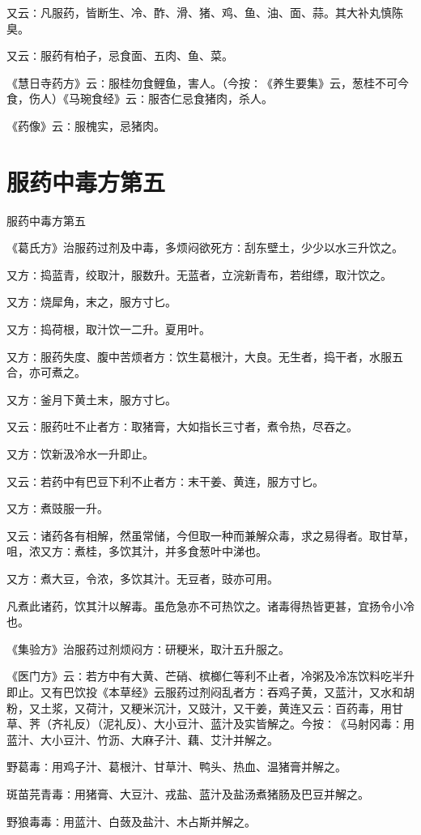 \documentclass[a4paper,12pt,UTF8,twoside]{ctexbook}
\begin{document}
又云∶凡服药，皆断生、冷、酢、滑、猪、鸡、鱼、油、面、蒜。其大补丸慎陈臭。

又云∶服药有柏子，忌食面、五肉、鱼、菜。

《慧日寺药方》云∶服桂勿食鲤鱼，害人。（今按∶《养生要集》云，葱桂不可今食，伤人）《马琬食经》云∶服杏仁忌食猪肉，杀人。

《药像》云∶服槐实，忌猪肉。

\chapter{服药中毒方第五}
服药中毒方第五

《葛氏方》治服药过剂及中毒，多烦闷欲死方∶刮东壁土，少少以水三升饮之。

又方∶捣蓝青，绞取汁，服数升。无蓝者，立浣新青布，若绀缥，取汁饮之。

又方∶烧犀角，末之，服方寸匕。

又方∶捣荷根，取汁饮一二升。夏用叶。

又方∶服药失度、腹中苦烦者方∶饮生葛根汁，大良。无生者，捣干者，水服五合，亦可煮之。

又方∶釜月下黄土末，服方寸匕。

又云∶服药吐不止者方∶取猪膏，大如指长三寸者，煮令热，尽吞之。

又方∶饮新汲冷水一升即止。

又云∶若药中有巴豆下利不止者方∶末干姜、黄连，服方寸匕。

又方∶煮豉服一升。

又云∶诸药各有相解，然虽常储，今但取一种而兼解众毒，求之易得者。取甘草，咀，浓又方∶煮桂，多饮其汁，并多食葱叶中涕也。

又方∶煮大豆，令浓，多饮其汁。无豆者，豉亦可用。

凡煮此诸药，饮其汁以解毒。虽危急亦不可热饮之。诸毒得热皆更甚，宜扬令小冷也。

《集验方》治服药过剂烦闷方∶研粳米，取汁五升服之。

《医门方》云∶若方中有大黄、芒硝、槟榔仁等利不止者，冷粥及冷冻饮料吃半升即止。又有巴饮投《本草经》云服药过剂闷乱者方∶吞鸡子黄，又蓝汁，又水和胡粉，又土浆，又荷汁，又粳米沉汁，又豉汁，又干姜，黄连又云∶百药毒，用甘草、荠（齐礼反）（泥礼反）、大小豆汁、蓝汁及实皆解之。今按∶《马射冈毒∶用蓝汁、大小豆汁、竹沥、大麻子汁、藕、艾汁并解之。

野葛毒∶用鸡子汁、葛根汁、甘草汁、鸭头、热血、温猪膏并解之。

斑苗芫青毒∶用猪膏、大豆汁、戎盐、蓝汁及盐汤煮猪肠及巴豆并解之。

野狼毒毒∶用蓝汁、白蔹及盐汁、木占斯并解之。
\end{document}
